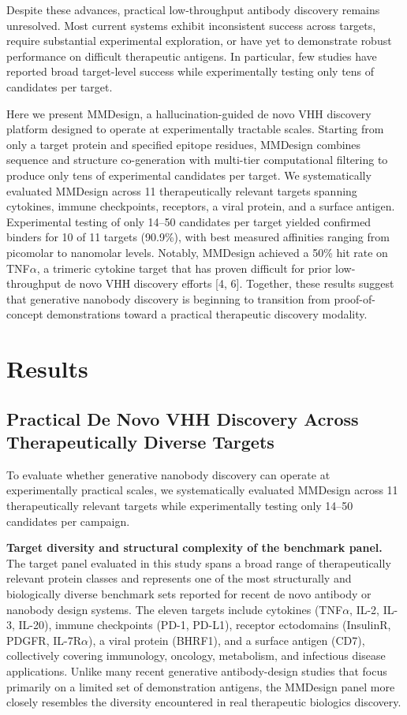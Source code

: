 \documentclass[11pt]{article}
\begin{document}
Despite these advances, practical low-throughput antibody discovery remains unresolved.
Most current systems exhibit inconsistent success across targets, require substantial experimental
exploration, or have yet to demonstrate robust performance on difficult therapeutic antigens. In
particular, few studies have reported broad target-level success while experimentally testing only
tens of candidates per target.

Here we present MMDesign, a hallucination-guided de novo VHH discovery platform designed
to operate at experimentally tractable scales. Starting from only a target protein and specified epitope
residues, MMDesign combines sequence and structure co-generation with multi-tier computational
filtering to produce only tens of experimental candidates per target. We systematically evaluated
MMDesign across 11 therapeutically relevant targets spanning cytokines, immune checkpoints,
receptors, a viral protein, and a surface antigen. Experimental testing of only 14--50 candidates
per target yielded confirmed binders for 10 of 11 targets (90.9\%), with best measured affinities
ranging from picomolar to nanomolar levels. Notably, MMDesign achieved a 50\% hit rate on TNF$\alpha$,
a trimeric cytokine target that has proven difficult for prior low-throughput de novo VHH discovery
efforts [4, 6]. Together, these results suggest that generative nanobody discovery is beginning to
transition from proof-of-concept demonstrations toward a practical therapeutic discovery modality.

\section{Results}

\subsection{Practical De Novo VHH Discovery Across Therapeutically Diverse Targets}
To evaluate whether generative nanobody discovery can operate at experimentally practical scales,
we systematically evaluated MMDesign across 11 therapeutically relevant targets while experimentally testing only 14--50 candidates per campaign.

\textbf{Target diversity and structural complexity of the benchmark panel.} The target panel evaluated
in this study spans a broad range of therapeutically relevant protein classes and represents one of
the most structurally and biologically diverse benchmark sets reported for recent de novo antibody
or nanobody design systems. The eleven targets include cytokines (TNF$\alpha$, IL-2, IL-3, IL-20),
immune checkpoints (PD-1, PD-L1), receptor ectodomains (InsulinR, PDGFR, IL-7R$\alpha$), a viral protein
(BHRF1), and a surface antigen (CD7), collectively covering immunology, oncology, metabolism,
and infectious disease applications. Unlike many recent generative antibody-design studies that
focus primarily on a limited set of demonstration antigens, the MMDesign panel more closely
resembles the diversity encountered in real therapeutic biologics discovery.
\end{document}
